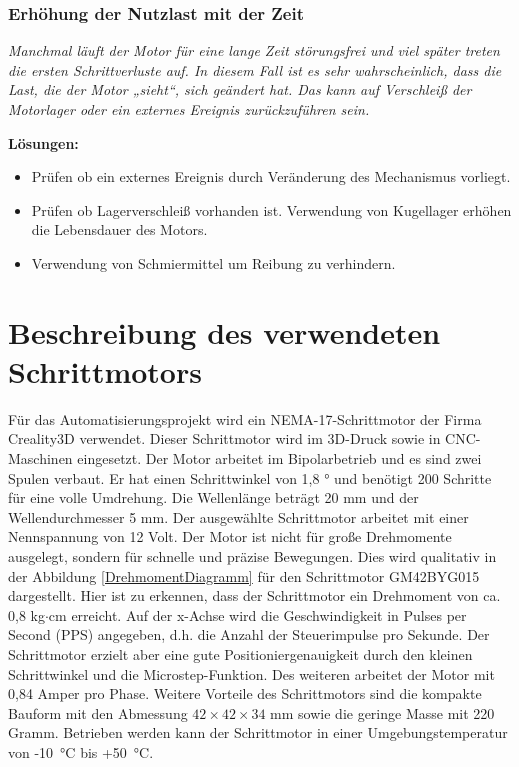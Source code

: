 {{{			\subsubsection{Erhöhung der Nutzlast mit der Zeit}
			\textit{\glqq Manchmal läuft der Motor für eine lange Zeit störungsfrei und viel später treten die ersten Schrittverluste auf. In diesem Fall ist es sehr wahrscheinlich, dass die Last, die der Motor „sieht“, sich geändert hat. Das kann auf Verschleiß der Motorlager oder ein externes Ereignis zurückzuführen sein.\grqq}\cite{Faulhaber:2020}
			
			\textbf{Lösungen:}
			\begin{itemize}
				\item Prüfen ob ein externes Ereignis durch Veränderung des Mechanismus vorliegt.
				\item Prüfen ob Lagerverschleiß vorhanden ist. Verwendung von Kugellager erhöhen die Lebensdauer des Motors.
				\item Verwendung von Schmiermittel um Reibung zu verhindern.
			\end{itemize}
			
			
			\section{Beschreibung des verwendeten Schrittmotors}
			
			Für das Automatisierungsprojekt wird ein NEMA-17-Schrittmotor der Firma Creality3D verwendet. Dieser Schrittmotor wird im 3D-Druck sowie in CNC-Maschinen eingesetzt. Der Motor arbeitet im Bipolarbetrieb und es sind zwei Spulen verbaut. Er hat einen Schrittwinkel von 1,8 ° und benötigt 200 Schritte für eine volle Umdrehung. Die Wellenlänge beträgt 20 mm und der Wellendurchmesser 5 mm. Der ausgewählte Schrittmotor arbeitet mit einer Nennspannung von 12 Volt. Der Motor ist nicht für große Drehmomente ausgelegt, sondern für schnelle und präzise Bewegungen.  Dies wird qualitativ in der Abbildung \ref{DrehmomentDiagramm} für den Schrittmotor GM42BYG015 dargestellt. Hier ist zu erkennen, dass der Schrittmotor ein Drehmoment von ca. 0,8 kg$\cdot$cm erreicht. Auf der x-Achse wird die Geschwindigkeit in Pulses per Second (PPS) angegeben, d.h. die Anzahl der Steuerimpulse pro Sekunde. Der Schrittmotor erzielt aber eine gute Positioniergenauigkeit durch den kleinen Schrittwinkel und die Microstep-Funktion. Des weiteren arbeitet der Motor mit 0,84 Amper pro Phase. Weitere Vorteile des Schrittmotors sind die kompakte Bauform mit den Abmessung $42\times 42\times 34$ mm sowie die geringe Masse mit 220 Gramm. Betrieben werden kann der Schrittmotor in einer Umgebungstemperatur von -10\ °C bis +50\ °C.\cite{Gems:2014,Gems:2022}
			
}}}
